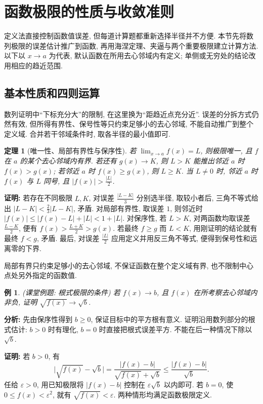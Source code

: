 \documentclass[UTF8,openany]{ctexbook}
\theoremstyle{chinesetextbook}
\newtheorem{example}{例}[section]
\newtheorem{theorem}{定理}[section]
\newenvironment{cnproof}{\par\indent\textbf{证明:} \ignorespaces}{\par}
\begin{document}
\section{函数极限的性质与收敛准则}
定义法直接控制函数值误差, 但每道计算题都重新选择半径并不方便. 本节先将数列极限的误差估计推广到函数, 再用海涅定理、夹逼与两个重要极限建立计算方法. 以下以 $x\to a$ 为代表, 默认函数在所用去心邻域内有定义; 单侧或无穷处的结论改用相应的趋近范围.
\subsection{基本性质和四则运算}
数列证明中“下标充分大”的限制, 在这里换为“距趋近点充分近”. 误差的分拆方式仍然有效, 但所得有界性、保号性等只约束足够小的去心邻域, 不能自动推广到整个定义域. 合并若干邻域条件时, 取各半径的最小值即可.
\begin{theorem}[唯一性、局部有界性与保序性]
若 $\displaystyle \lim_{x\to a}f(x)=L$, 则极限唯一, 且 $f$ 在 $a$ 的某个去心邻域内有界. 若还有 $g(x)\to K$, 则 $L>K$ 能推出邻近 $a$ 时 $f(x)>g(x)$; 若邻近 $a$ 时 $f(x)\ge g(x)$, 则 $L\ge K$. 当 $L\ne0$ 时, 邻近 $a$ 时 $f(x)$ 与 $L$ 同号, 且 $\displaystyle |f(x)|>\frac{|L|}{2}$.
\end{theorem}
\begin{cnproof}
若存在不同极限 $L,K$, 对误差 $\displaystyle \frac{|L-K|}{3}$ 分别选半径, 取较小者后, 三角不等式给出 $\displaystyle |L-K|<\frac23|L-K|$, 矛盾. 对局部有界性, 取误差 $1$, 则邻近时 $|f(x)|\le|f(x)-L|+|L|<1+|L|$. 对保序性, 若 $L>K$, 对两函数均取误差 $\displaystyle \frac{L-K}{2}$, 便有 $\displaystyle f(x)>\frac{L+K}{2}>g(x)$. 若最终 $f\ge g$ 而 $L<K$, 用刚证明的结论就有最终 $f<g$, 矛盾. 最后, 对误差 $\displaystyle \frac{|L|}{2}$ 应用定义并用反三角不等式, 便得到保号性和远离零的下界.
\end{cnproof}
局部有界只约束足够小的去心邻域, 不保证函数在整个定义域有界, 也不限制中心点处另外指定的函数值.
\begin{example}
(课堂例题: 根式极限的条件) 若 $f(x)\to b$, 且 $f(x)$ 在所考察去心邻域内非负, 证明 $\sqrt{f(x)}\to\sqrt b$.
\end{example}
\par\indent\textbf{分析:} 先由保序性得到 $b\ge0$, 保证目标中的平方根有意义. 证明沿用数列部分的根式估计: $b>0$ 时有理化, $b=0$ 时直接把根式误差平方. 不能在后一种情况下除以 $\sqrt b$.
\begin{cnproof}
若 $b>0$, 有
\[
\bigl|\sqrt{f(x)}-\sqrt b\bigr|
=\frac{|f(x)-b|}{\sqrt{f(x)}+\sqrt b}
\le\frac{|f(x)-b|}{\sqrt b}.
\]
任给 $\varepsilon>0$, 用已知极限将 $|f(x)-b|$ 控制在 $\varepsilon\sqrt b$ 以内即可. 若 $b=0$, 使 $0\le f(x)<\varepsilon^2$, 就有 $\sqrt{f(x)}<\varepsilon$. 两种情形均满足函数极限定义.
\end{cnproof}
\end{document}
